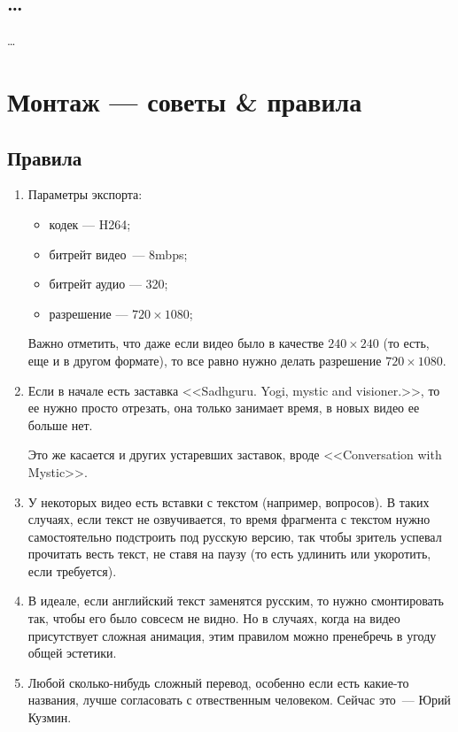 \documentclass[
a4paper, %
12pt, %
article,
onecolumn, %
openany, %
]{memoir}
\begin{document}
\subsection{\ldots}
\ldots

\section{Монтаж --- советы \& правила}\label{montageRules}
\subsection{Правила}
\begin{enumerate}
\item Параметры экспорта:
    \begin{itemize}
    \item кодек --- H264;
    \item битрейт видео~--- 8mbps;
    \item битрейт аудио --- 320;
    \item разрешение --- $720 \times 1080$;
    \end{itemize}

    Важно отметить, что даже если видео было в качестве $240 \times 240$ (то есть, еще и в другом формате), то все равно нужно делать разрешение $720 \times 1080$.
\item Если в начале есть заставка <<Sadhguru. Yogi, mystic and visioner.>>, то ее нужно просто отрезать, она только занимает время, в новых видео ее больше нет. 

    Это же касается и других устаревших заставок, вроде <<Conversation with Mystic>>.
\item У некоторых видео есть вставки с текстом (например, вопросов). В таких случаях, если текст не озвучивается, то время фрагмента с текстом нужно самостоятельно подстроить под русскую версию, так чтобы зритель успевал прочитать весть текст, не ставя на паузу (то есть удлинить или укоротить, если требуется).  

\item В идеале, если английский текст заменятся русским, то нужно смонтировать так, чтобы его было совсесм не видно. Но в случаях, когда на видео присутствует сложная анимация, этим правилом можно пренебречь в угоду общей эстетики.

\item Любой сколько-нибудь сложный перевод, особенно если есть какие-то названия, лучше согласовать с отвественным человеком. Сейчас это~--- Юрий Кузмин.
\end{enumerate}
\end{document}
